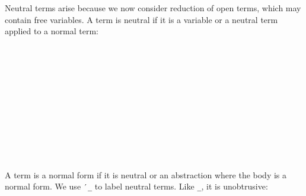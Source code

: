 Neutral terms arise because we now consider reduction of open terms,
which may contain free variables. A term is neutral if it is a variable
or a neutral term applied to a normal term:

\begin{fence}
\begin{code}%
\>[0]\AgdaSpace{}%
\AgdaSpace{}%
\<%
\\
%
\\[\AgdaEmptyExtraSkip]%
\>[0][@{}l@{\AgdaIndent{0}}]%
\>[2]%
\>[6]\AgdaSymbol{:}\AgdaSpace{}%
\AgdaSpace{}%
\AgdaSymbol{\{}\AgdaSpace{}%
\AgdaSymbol{\}}\AgdaSpace{}%
\AgdaSymbol{(}\AgdaSpace{}%
\AgdaSymbol{:}\AgdaSpace{}%
\AgdaSpace{}%
\AgdaSpace{}%
\AgdaSymbol{)}\<%
\\
%
\>[6]\AgdaComment{-------------}\<%
\\
\>[2][@{}l@{\AgdaIndent{0}}]%
\>[4]\AgdaSpace{}%
\AgdaSpace{}%
\AgdaSymbol{(}\AgdaSpace{}%
\AgdaSymbol{)}\<%
\\
%
\\[\AgdaEmptyExtraSkip]%
%
\>[2]%
\>[7]\AgdaSymbol{:}\AgdaSpace{}%
\AgdaSpace{}%
\AgdaSymbol{\{}\AgdaSymbol{\}}\AgdaSpace{}%
\AgdaSymbol{\{}\AgdaSpace{}%
\AgdaSpace{}%
\AgdaSymbol{:}\AgdaSpace{}%
\AgdaSpace{}%
\AgdaSpace{}%
\AgdaSymbol{\}}\<%
\\
\>[2][@{}l@{\AgdaIndent{0}}]%
\>[4]\AgdaSpace{}%
\AgdaSpace{}%
\<%
\\
%
\>[4]%
\>[538I]\AgdaSpace{}%
\<%
\\
\>[.][@{}l@{}]\<[538I]%
\>[6]\AgdaComment{---------------}\<%
\\
%
\>[4]\AgdaSpace{}%
\AgdaSpace{}%
\AgdaSymbol{(}\AgdaSpace{}%
\AgdaSpace{}%
\AgdaSymbol{)}\<%
\end{code}
\end{fence}

A term is a normal form if it is neutral or an abstraction where the
body is a normal form. We use \texttt{′\_} to label neutral terms. Like
\texttt{\textasciigrave{}\_}, it is unobtrusive:

